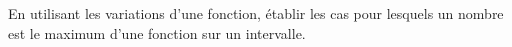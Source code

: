 
En utilisant les variations d'une fonction, établir les cas pour lesquels un nombre est le maximum d'une fonction sur un intervalle.